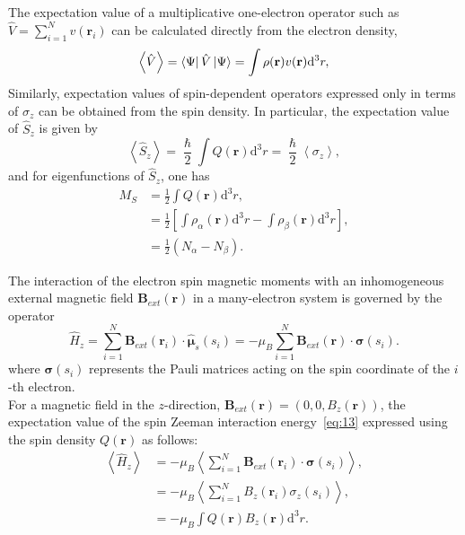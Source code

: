 \documentclass[%
 preprint, linenumbers,
 amsmath,amssymb,
 aps, physrev,
]{revtex4-2}
\begin{document}
The expectation value of a multiplicative one-electron operator such as $\hat{V} = \sum_{i=1}^{N}v(\mathbf{r}_i)$ can be calculated directly from the electron density,
\begin{equation}
    \left\langle \hat{V} \right\rangle = \bra{\Psi}\hat{V}\ket{\Psi} = \int\rho(\mathbf{r})v(\mathbf{r})\mathrm{d}^3r,
\end{equation}
Similarly, expectation values of spin-dependent operators expressed only in terms of $\sigma_z$ can be obtained from the spin density. In particular, the expectation value of $\hat{S}_z$ is given by
\begin{equation}
    \left\langle \hat{S}_z \right\rangle = \frac{\hslash}{2}\int Q(\mathbf{r})\mathrm{d}^3r = \frac{\hslash}{2}\left\langle \sigma_z \right\rangle,
\end{equation}
and for eigenfunctions of $\hat{S}_z$, one has
\begin{align}
    M_S &= \frac{1}{2}\int Q(\mathbf{r})\mathrm{d}^3r, \\
        &= \frac{1}{2}\left[ \int\rho_{\alpha}(\mathbf{r})\mathrm{d}^3r - \int\rho_{\beta}(\mathbf{r})\mathrm{d}^3r \right], \\
        &= \frac{1}{2}(N_{\alpha} - N_{\beta}).
\end{align}

The interaction of the electron spin magnetic moments with an inhomogeneous external magnetic field $\mathbf{B}_{ext}(\mathbf{r})$ in a many-electron system is governed by the operator
\begin{equation}
    \hat{H}_z = \sum_{i=1}^{N}\mathbf{B}_{ext}(\mathbf{r}_i)\cdot \hat{\bm{\mu}}_s(s_i) = -\mu_B\sum_{i=1}^{N}\mathbf{B}_{ext}(\mathbf{r})\cdot \bm{\sigma}(s_i).
    \label{eq:13}
\end{equation}
where $\bm{\sigma}(s_i)$ represents the Pauli matrices acting on the spin coordinate of the $i$-th electron.\\

For a magnetic field in the $z$-direction, $\mathbf{B}_{ext}(\mathbf{r}) = (0,0,B_z(\mathbf{r}))$, the expectation value of the spin Zeeman interaction energy~\eqref{eq:13} expressed using the spin density $Q(\mathbf{r})$ as follows:
\begin{align}
    \left\langle \hat{H}_z \right\rangle &= -\mu_B \left\langle \sum_{i=1}^{N}\mathbf{B}_{ext}(\mathbf{r}_i)\cdot\bm{\sigma}(s_i) \right\rangle, \\
    &= -\mu_B\left\langle \sum_{i=1}^{N}B_z(\mathbf{r}_i)\sigma_z(s_i) \right\rangle, \\
    &= -\mu_B\int Q(\mathbf{r})B_z(\mathbf{r})\mathrm{d}^3r.
\end{align}
\end{document}

